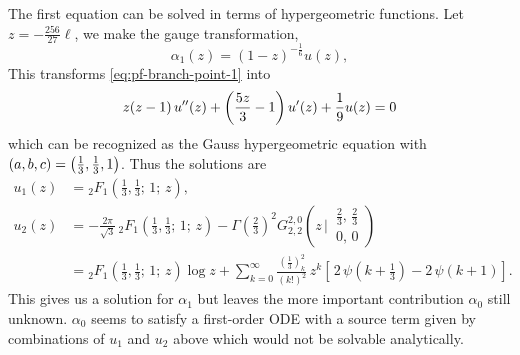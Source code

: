 \documentclass[11pt, a4paper]{article}
\newcommand{\hypF}[4]{{}_2F_{1}\!\left(#1,#2;\,#3;\,#4\right)}
\numberwithin{equation}{section}
\begin{document}
The first equation can be solved in terms of hypergeometric functions. Let $z = -\tfrac{256}{27} \ell$, we make the gauge transformation,
\begin{equation}
  \alpha_1(z) = (1 - z)^{-\tfrac16} u(z),
\end{equation}
This transforms \cref{eq:pf-branch-point-1} into
\begin{equation}
  z (z-1) \, u''(z) + \qty(\frac{5 z}{3}-1) \, u'(z) + \frac19 u(z) = 0
\end{equation}
which can be recognized as the Gauss hypergeometric equation with $(a, b, c) = \qty(\tfrac13, \tfrac13, 1)$. Thus the solutions are
\begin{equation}
  \begin{aligned}
    u_1(z) &= \hypF{\tfrac13}{\tfrac13}{1}{z}, \\
    u_2(z) &= -\frac{2\pi}{\sqrt{3}} \, \hypF{\tfrac13}{\tfrac13}{1}{z} - \Gamma\!\left(\tfrac23\right)^2 G^{2,0}_{2,2}\!\left(
      z \,\Bigg|\,
      \begin{matrix}
      \tfrac23,\,\tfrac23\\
      0,\,0
      \end{matrix}
      \right) \\
    &=\hypF{\tfrac13}{\tfrac13}{1}{z} \log z + \sum_{k=0}^{\infty}\frac{\left(\frac{1}{3}\right)_{k}^{2}}{(k!)^{2}}\,z^{k}
      \left[\,2\,\psi\!\left(k+\frac{1}{3}\right)-2\,\psi(k+1)\right].
  \end{aligned}
\end{equation}
This gives us a solution for $\alpha_1$ but leaves the more important contribution $\alpha_0$ still unknown. $\alpha_0$ seems to satisfy a first-order ODE with a source term given by combinations of $u_1$ and $u_2$ above which would not be solvable analytically.
\end{document}
